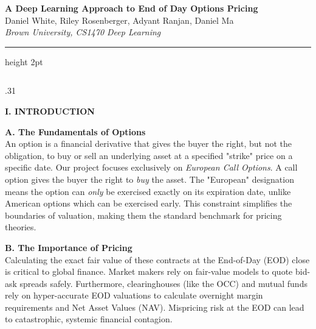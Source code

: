\documentclass[final]{beamer}
\begin{document}
\begin{frame}[fragile]{}

\begin{center}
    {\Huge \textbf{A Deep Learning Approach to End of Day Options Pricing}}\\[0.8em]
    {\Large Daniel White, Riley Rosenberger, Adyant Ranjan, Daniel Ma}\\[0.4em]
    {\large \textit{Brown University, CS1470 Deep Learning}}
\end{center}
\vspace{0.2cm}
\hrule height 2pt
\vspace{1cm}

\begin{columns}[t]

    \begin{column}{.31\linewidth}

        {\Large \textbf{I. INTRODUCTION}}
        \vspace{0.5em}

        \textbf{A. The Fundamentals of Options}\\
        An option is a financial derivative that gives the buyer the right, but not the obligation, to buy or sell an underlying asset at a specified "strike" price on a specific date. Our project focuses exclusively on \textit{European Call Options}. A call option gives the buyer the right to \textit{buy} the asset. The "European" designation means the option can \textit{only} be exercised exactly on its expiration date, unlike American options which can be exercised early. This constraint simplifies the boundaries of valuation, making them the standard benchmark for pricing theories.
        \vspace{0.5em}

        \textbf{B. The Importance of Pricing}\\
        Calculating the exact fair value of these contracts at the End-of-Day (EOD) close is critical to global finance. Market makers rely on fair-value models to quote bid-ask spreads safely. Furthermore, clearinghouses (like the OCC) and mutual funds rely on hyper-accurate EOD valuations to calculate overnight margin requirements and Net Asset Values (NAV). Mispricing risk at the EOD can lead to catastrophic, systemic financial contagion.
        \vspace{0.5em}


\end{column}
\end{columns}
\end{frame}
\end{document}
